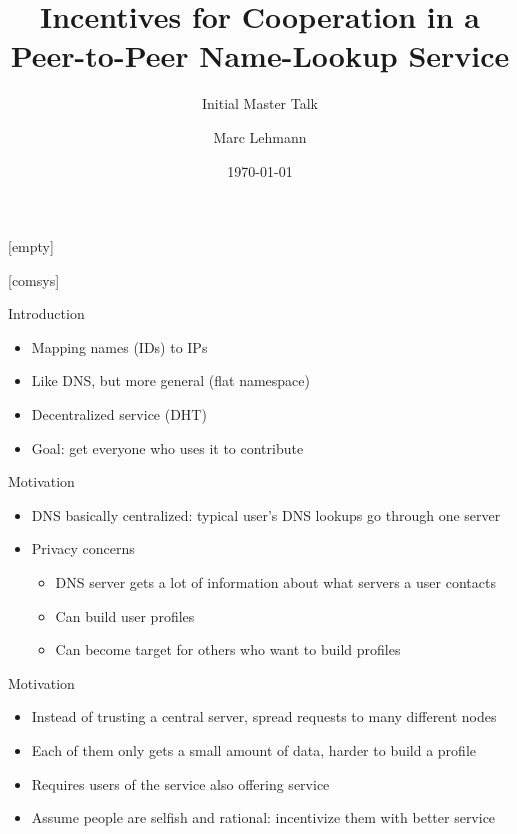 \documentclass[presentation,english]{beamer}
\title[Peer-to-Peer Incentives]{Incentives for Cooperation in a Peer-to-Peer
Name-Lookup Service}
\author{Marc Lehmann}
\subtitle{Initial Master Talk}
\date{\today}
\begin{document}
[empty]
\begin{frame}
  \titlepage
\end{frame}

[comsys]

\begin{frame}{Introduction}
  \begin{itemize}
    \item Mapping names (IDs) to IPs
    \item Like DNS, but more general (flat namespace)
    \item Decentralized service (DHT)
    \item Goal: get everyone who uses it to contribute
  \end{itemize}
\end{frame}

\begin{frame}{Motivation}
  \begin{itemize}
    \item DNS basically centralized: typical user's DNS lookups go through one
          server
    \item Privacy concerns
    \begin{itemize}
      \item DNS server gets a lot of information about what servers a user
            contacts
      \item Can build user profiles
      \item Can become target for others who want to build profiles
    \end{itemize}
  \end{itemize}
\end{frame}

\begin{frame}{Motivation}
  \begin{itemize}
    \item Instead of trusting a central server, spread requests to many
          different nodes
    \item Each of them only gets a small amount of data, harder to build a
          profile
    \item Requires users of the service also offering service
    \item Assume people are selfish and rational: incentivize them with better
          service
  \end{itemize}
\end{frame}
\end{document}
